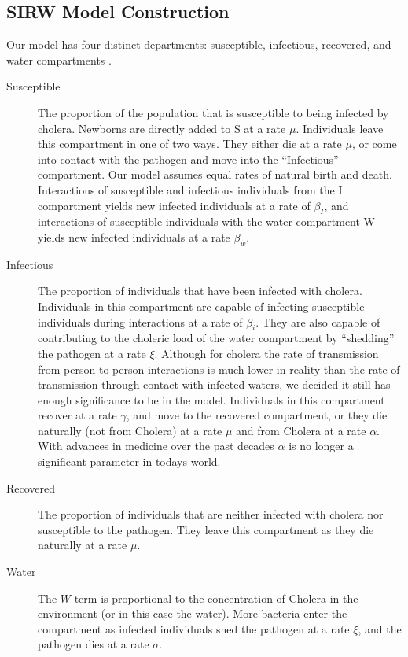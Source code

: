 \documentclass[12pt]{article}\usepackage[]{graphicx}\usepackage[]{color}
\begin{document}
\subsection{SIRW Model Construction}
Our model has four distinct departments: susceptible, infectious, recovered, and water compartments \citep{link9}.
\begin{description}
    \item [Susceptible] The proportion of the population that is susceptible to being infected by cholera.
Newborns are directly added to S at a rate $\mu$.
Individuals leave this compartment in one of two ways. They either die at a rate $\mu$, or come into contact with the pathogen and move into the “Infectious” compartment. Our model assumes equal rates of natural birth and death.
Interactions of susceptible and infectious individuals from the I compartment yields new infected individuals at a rate of $\beta_I$, and interactions of susceptible individuals with the water compartment W yields new infected individuals at a rate $\beta_w$.\par
  \item [Infectious] The proportion of individuals that have been infected with cholera.
Individuals in this compartment are capable of infecting susceptible individuals during interactions at a rate of $\beta_i$.
They are also capable of contributing to the choleric load of the water compartment by “shedding” the pathogen at a rate $\xi$. 
Although for cholera the rate of transmission from person to person interactions is much lower in reality than the rate of transmission through contact with infected waters, we decided it still has enough significance to be in the model.
Individuals in this compartment recover at a rate $\gamma$, and move to the recovered compartment, or they die naturally (not from Cholera) at a rate $\mu$ and from Cholera at a rate $\alpha$. 
With advances in medicine over the past decades $\alpha$ is no longer a significant parameter in todays world.\par
  \item [Recovered] The proportion of individuals that are neither infected with cholera nor susceptible to the pathogen.
They leave this compartment as they die naturally at a rate $\mu$.
  \item [Water] The $W$ term is proportional to the concentration of Cholera in the environment (or in this case the water).
More bacteria enter the compartment as infected individuals shed the pathogen at a rate $\xi$, and the pathogen dies at a rate $\sigma$.
\end{description}
\end{document}

